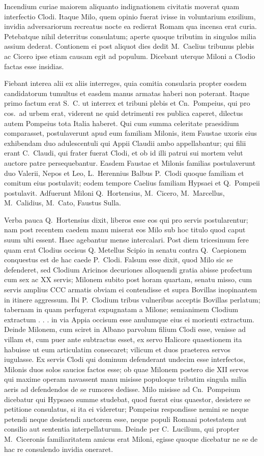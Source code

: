 Incendium curiae maiorem aliquanto indignationem civitatis moverat quam interfectio Clodi. Itaque Milo, quem opinio fuerat ivisse in voluntarium exsilium, invidia adversariorum recreatus nocte ea redierat Romam qua incensa erat curia. Petebatque nihil deterritus consulatum; aperte quoque tributim in singulos milia assium dederat. Contionem ei post aliquot dies dedit M.~Caelius tribunus plebis ac Cicero ipse etiam causam egit ad populum. Dicebant uterque Miloni a Clodio factas esse insidias.

Fiebant interea alii ex aliis interreges, quia comitia consularia propter eosdem candidatorum tumultus et easdem manus armatas haberi non poterant. Itaque primo factum erat S.~C. ut interrex et tribuni plebis et Cn.~Pompeius, qui pro cos.\ ad urbem erat, viderent ne quid detrimenti res publica caperet, dilectus autem Pompeius tota Italia haberet. Qui cum summa celeritate praesidium comparasset, postulaverunt apud eum familiam Milonis, item Faustae uxoris eius exhibendam duo adulescentuli qui Appii Claudii ambo appellabantur; qui filii erant C.~Claudi, qui frater fuerat Clodi, et ob id illi patrui sui mortem velut auctore patre persequebantur. Easdem Faustae et Milonis familias postulaverunt duo Valerii, Nepos et Leo, L.~Herennius Balbus P.~Clodi quoque familiam et comitum eius postulavit; eodem tempore Caelius familiam Hypsaei et Q.~Pompeii postulavit. Adfuerunt Miloni Q.~Hortensius, M.~Cicero, M.~Marcellus, M.~Calidius, M.~Cato, Faustus Sulla. 

Verba pauca Q.~Hortensius dixit, liberos esse eos qui pro servis postularentur; nam post recentem caedem manu miserat eos Milo sub hoc titulo quod caput suum ulti essent. Haec agebantur mense intercalari. Post diem tricesimum fere quam erat Clodius occisus Q. Metellus Scipio in senatu contra Q.~Caepionem conquestus est de hac caede P.~Clodi. Falsum esse dixit, quod Milo sic se defenderet, sed Clodium Aricinos decuriones alloquendi gratia abisse profectum cum sex ac XX servis; Milonem subito post horam quartam, senatu misso, cum servis amplius CCC armatis obviam ei contendisse et supra Bovillas inopinantem in itinere aggressum. Ibi P.~Clodium tribus vulneribus acceptis Bovillas perlatum; tabernam in quam perfugerat expugnatam a Milone; semianimem Clodium extractum . . . in via Appia occisum esse anulumque eius ei morienti extractum. Deinde Milonem, cum sciret in Albano parvolum filium Clodi esse, venisse ad villam et, cum puer ante subtractus esset, ex servo Halicore quaestionem ita habuisse ut eum articulatim consecaret; vilicum et duos praeterea servos iugulasse. Ex servis Clodi qui dominum defenderant undecim esse interfectos, Milonis duos solos saucios factos esse; ob quae Milonem postero die XII servos qui maxime operam navassent manu misisse populoque tributim singula milia aeris ad defendendos de se rumores dedisse. Milo misisse ad Cn.~Pompeium dicebatur qui Hypsaeo summe studebat, quod fuerat eius quaestor, desistere se petitione consulatus, si ita ei videretur; Pompeius respondisse nemini se neque petendi neque desistendi auctorem esse, neque populi Romani potestatem aut consilio aut sententia interpellaturum. Deinde per C.~Lucilium, qui propter M.~Ciceronis familiaritatem amicus erat Miloni, egisse quoque dicebatur ne se de hac re consulendo invidia oneraret.

